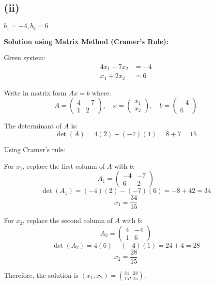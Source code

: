 \subsection*{(ii)} $b_1 = -4, b_2 = 6$

\textbf{Solution using Matrix Method (Cramer's Rule):}

Given system:
\begin{align}
4x_1 - 7x_2 &= -4\\
x_1 + 2x_2 &= 6
\end{align}

Write in matrix form $Ax = b$ where:
\[
A = \begin{pmatrix}
4 & -7\\
1 & 2
\end{pmatrix}, \quad
x = \begin{pmatrix}
x_1\\
x_2
\end{pmatrix}, \quad
b = \begin{pmatrix}
-4\\
6
\end{pmatrix}
\]

The determinant of $A$ is:
\[
\det(A) = 4(2) - (-7)(1) = 8 + 7 = 15
\]

Using Cramer's rule:

For $x_1$, replace the first column of $A$ with $b$:
\[
A_1 = \begin{pmatrix}
-4 & -7\\
6 & 2
\end{pmatrix}
\]
\[
\det(A_1) = (-4)(2) - (-7)(6) = -8 + 42 = 34
\]
\[
x_1 = \frac{34}{15}
\]

For $x_2$, replace the second column of $A$ with $b$:
\[
A_2 = \begin{pmatrix}
4 & -4\\
1 & 6
\end{pmatrix}
\]
\[
\det(A_2) = 4(6) - (-4)(1) = 24 + 4 = 28
\]
\[
x_2 = \frac{28}{15}
\]

Therefore, the solution is $\boxed{\left(x_1, x_2\right) = \left(\frac{34}{15}, \frac{28}{15}\right)}$.